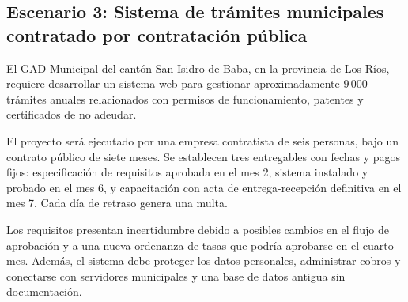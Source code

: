 

\subsection{Escenario 3: Sistema de trámites municipales contratado por contratación pública}

El GAD Municipal del cantón San Isidro de Baba, en la provincia de Los Ríos, requiere desarrollar un sistema web para gestionar aproximadamente 9\,000 trámites anuales relacionados con permisos de funcionamiento, patentes y certificados de no adeudar.

El proyecto será ejecutado por una empresa contratista de seis personas, bajo un contrato público de siete meses. Se establecen tres entregables con fechas y pagos fijos: especificación de requisitos aprobada en el mes 2, sistema instalado y probado en el mes 6, y capacitación con acta de entrega-recepción definitiva en el mes 7. Cada día de retraso genera una multa.

Los requisitos presentan incertidumbre debido a posibles cambios en el flujo de aprobación y a una nueva ordenanza de tasas que podría aprobarse en el cuarto mes. Además, el sistema debe proteger los datos personales, administrar cobros y conectarse con servidores municipales y una base de datos antigua sin documentación.

\small
\setlength{\tabcolsep}{4pt}
\renewcommand{\arraystretch}{1.35}

